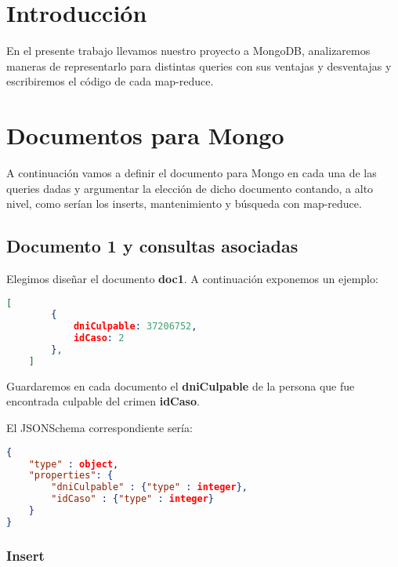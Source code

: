 \documentclass[11pt, a4paper]{article}
\begin{document}

\maketitle
\newpage

\tableofcontents
\newpage

%
\section{Introducción}

En el presente trabajo llevamos nuestro proyecto a MongoDB, analizaremos maneras de representarlo para distintas queries con sus ventajas y desventajas y escribiremos el c\'odigo de cada map-reduce.

\section{Documentos para Mongo}

A continuaci\'on vamos a definir el documento para Mongo en cada una de las queries dadas y argumentar la elecci\'on de dicho documento contando, a alto nivel, como ser\'ian los inserts, mantenimiento y búsqueda con map-reduce.

\subsection{Documento 1 y consultas asociadas}

Elegimos diseñar el documento \textbf{doc1}. A continuación exponemos un ejemplo: 

\begin{lstlisting}[language=json]
	[
		{
			dniCulpable: 37206752,
			idCaso: 2
		},
	]
\end{lstlisting}

Guardaremos en cada documento el \textbf{dniCulpable} de la persona que fue encontrada culpable del crimen \textbf{idCaso}. \

El JSONSchema correspondiente sería:
\begin{lstlisting}[language=json]
{
	"type" : object,
	"properties": {
		"dniCulpable" : {"type" : integer},
		"idCaso" : {"type" : integer}
	}
}
\end{lstlisting}

\subsubsection{Insert}
\end{document}
